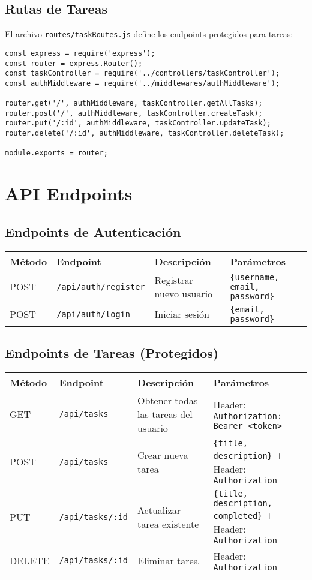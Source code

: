 \documentclass[12pt,a4paper]{article}
\begin{document}
\subsection{Rutas de Tareas}

El archivo \texttt{routes/taskRoutes.js} define los endpoints protegidos para tareas:

\begin{lstlisting}
const express = require('express');
const router = express.Router();
const taskController = require('../controllers/taskController');
const authMiddleware = require('../middlewares/authMiddleware');

router.get('/', authMiddleware, taskController.getAllTasks);
router.post('/', authMiddleware, taskController.createTask);
router.put('/:id', authMiddleware, taskController.updateTask);
router.delete('/:id', authMiddleware, taskController.deleteTask);

module.exports = router;
\end{lstlisting}

\section{API Endpoints}

\subsection{Endpoints de Autenticación}

\begin{longtable}{|l|l|l|p{6cm}|}
\hline
\textbf{Método} & \textbf{Endpoint} & \textbf{Descripción} & \textbf{Parámetros} \\
\hline
POST & \texttt{/api/auth/register} & Registrar nuevo usuario & \texttt{\{username, email, password\}} \\
\hline
POST & \texttt{/api/auth/login} & Iniciar sesión & \texttt{\{email, password\}} \\
\hline
\end{longtable}

\subsection{Endpoints de Tareas (Protegidos)}

\begin{longtable}{|l|l|l|p{6cm}|}
\hline
\textbf{Método} & \textbf{Endpoint} & \textbf{Descripción} & \textbf{Parámetros} \\
\hline
GET & \texttt{/api/tasks} & Obtener todas las tareas del usuario & Header: \texttt{Authorization: Bearer <token>} \\
\hline
POST & \texttt{/api/tasks} & Crear nueva tarea & \texttt{\{title, description\}} + Header: \texttt{Authorization} \\
\hline
PUT & \texttt{/api/tasks/:id} & Actualizar tarea existente & \texttt{\{title, description, completed\}} + Header: \texttt{Authorization} \\
\hline
DELETE & \texttt{/api/tasks/:id} & Eliminar tarea & Header: \texttt{Authorization} \\
\hline
\end{longtable}
\end{document}
